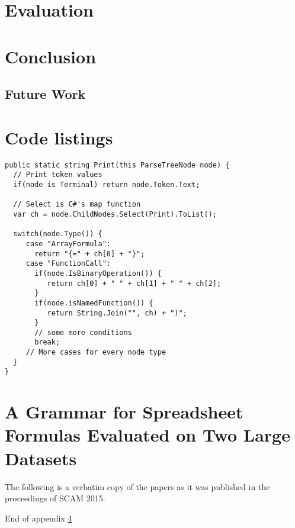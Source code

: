 \documentclass[12pt,a4paper,onecolumn,oneside,parskip]{memoir}
\begin{document}
\chapter{Evaluation}


\chapter{Conclusion}

\section{Future Work}




\appendix

\chapter{Code listings}

\lstset{style=sharpc}
\begin{lstlisting}[float,caption={XLParser Print method (simplified)}, label={lst:xlparserprint}]
public static string Print(this ParseTreeNode node) {
  // Print token values
  if(node is Terminal) return node.Token.Text;
  
  // Select is C#'s map function
  var ch = node.ChildNodes.Select(Print).ToList();
  
  switch(node.Type()) {
     case "ArrayFormula":
       return "{=" + ch[0] + "}";
     case "FunctionCall":
       if(node.IsBinaryOperation()) {
          return ch[0] + " " + ch[1] + " " + ch[2];
       }
       if(node.isNamedFunction()) {
          return String.Join("", ch) + ")";
       }
       // some more conditions
       break;
     // More cases for every node type
  }
}
\end{lstlisting}

\chapter{A Grammar for Spreadsheet Formulas Evaluated on Two Large Datasets}
\label{appendix:xlparser}

The following is a verbatim copy of the papers as it was published in the proceedings of SCAM 2015.

\clearpage



\clearpage

\vspace*{\fill}

\centering
\large{End of appendix \ref{appendix:xlparser}}

\vspace*{\fill}
\end{document}
